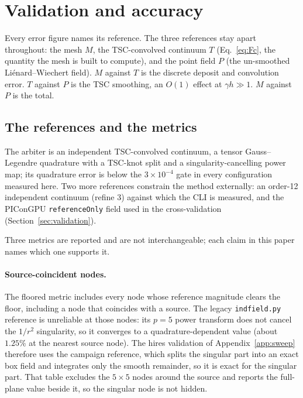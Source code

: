 \section{Validation and accuracy}
\label{sec:accuracy}

Every error figure names its reference. The three references stay apart
throughout: the mesh $M$, the TSC-convolved continuum $T$
(Eq.~\eqref{eq:Fc}, the quantity the mesh is built to compute), and the
point field $P$ (the un-smoothed Li\'enard--Wiechert field). $M$ against
$T$ is the discrete deposit and convolution error. $T$ against $P$ is the
TSC smoothing, an $O(1)$ effect at $\gamma h \gg 1$. $M$ against $P$ is the
total.

\subsection{The references and the metrics}

The arbiter is an independent TSC-convolved continuum, a tensor
Gauss--Legendre quadrature with a TSC-knot split and a singularity-cancelling
power map; its quadrature error is below the $3\times10^{-4}$ gate in every
configuration measured here. Two more references constrain the method
externally: an order-12 independent continuum (refine 3) against which the
CLI is measured, and the PIConGPU \texttt{referenceOnly} field used
in the cross-validation (Section~\ref{sec:validation}).

Three metrics are reported and are not interchangeable; each claim in this
paper names which one supports it.

\paragraph{Source-coincident nodes.}
The floored metric includes every node whose reference magnitude clears the
floor, including a node that coincides with a source. The legacy
\texttt{indfield.py} reference is unreliable at those nodes: its $p=5$ power
transform does not cancel the $1/r^2$ singularity, so it converges to a
quadrature-dependent value (about $1.25\%$ at the nearest source node). The
hires validation of Appendix~\ref{app:sweep} therefore uses the campaign
reference, which splits the singular part into an exact box field and
integrates only the smooth remainder, so it is exact for the singular part.
That table excludes the $5\times5$ nodes around the source and reports the
full-plane value beside it, so the singular node is not hidden.

